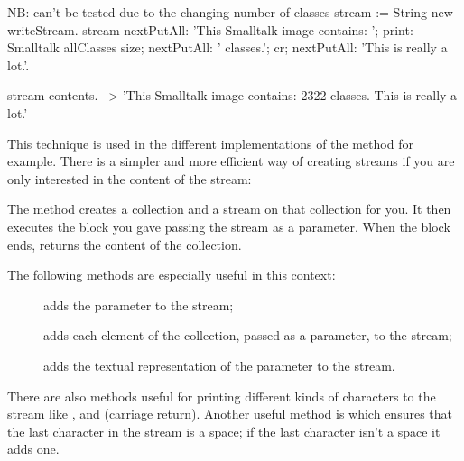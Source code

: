 \documentclass[a4paper,10pt,twoside]{book}
\begin{document}
\begin{code}{NB: can't be tested due to the changing number of classes}
stream := String new writeStream.
stream
  nextPutAll: 'This Smalltalk image contains: ';
  print: Smalltalk allClasses size;
  nextPutAll: ' classes.';
  cr;
  nextPutAll: 'This is really a lot.'.

stream contents. --> 'This Smalltalk image contains: 2322 classes.
This is really a lot.'
\end{code}

This technique is used in the different implementations of the method
 for example. There is a simpler and more efficient way
of creating streams if you are only interested in the content of the
stream:


The method   creates a collection and a stream on
that collection for you. It then executes the block you gave passing
the stream as a parameter. When the block ends, 
returns the content of the collection.

The following  methods are especially useful in this context:

\begin{description}
\item[] adds the parameter to the stream;
\item[] adds each element of the collection, passed as a
  parameter, to the stream;
\item[] adds the textual representation of the parameter to the
  stream.
\end{description}

There are also methods useful for printing different kinds of characters to
the stream like ,  and
 (carriage return). Another useful
method is  which ensures that the last character
in the stream is a space; if the last character isn't a space it adds one.
\end{document}
